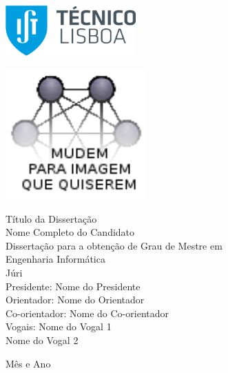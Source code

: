 \thispagestyle {empty}

\includegraphics[width=5.0cm]{Logo.png}

\begin{center}
%
\vspace{0.3cm}
\includegraphics[height=50mm]{Figures/frontImage.png}

\vspace{0.8cm}
{\FontLb Título da Dissertação} \\
\vspace{2.6cm}
{\FontMb Nome Completo do Candidato} \\
\vspace{1.9cm}
{\FontLn Disserta\c{c}\~{a}o para a obten\c{c}\~{a}o de Grau de Mestre em} \\
\vspace{0.3cm}
{\FontLb Engenharia Informática} \\
\vspace{1.9cm}
{\FontMb J\'{u}ri} \\
\vspace{0.3cm}
{\FontSn %
Presidente:        Nome do Presidente \\
Orientador:        Nome do Orientador \\
Co-orientador:     Nome do Co-orientador \\
Vogais:            Nome do Vogal 1 \\
                   Nome do Vogal 2 \\
}
\vspace{1.5cm}

{\FontMb M\^{e}s e Ano} \\
%
\end{center}

\cleardoublepage
